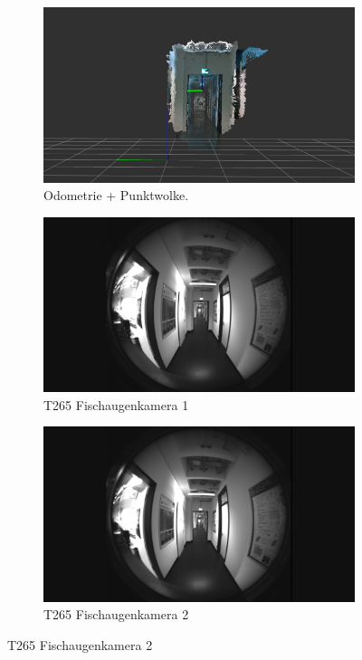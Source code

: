 \begin{figure}[h!]
	\centering
	\begin{subfigure}[b]{0.31\linewidth}
		\includegraphics[width=\linewidth]{images/dataset/pointcloud3.png}
		\caption{Odometrie + Punktwolke.}
	\end{subfigure}
	\begin{subfigure}[b]{0.31\linewidth}
		\includegraphics[width=\linewidth]{images/dataset/f1_frame000005.png}
		\caption{T265 Fischaugenkamera 1 }
	\end{subfigure}
	\begin{subfigure}[b]{0.31\linewidth}
		\includegraphics[width=\linewidth]{images/dataset/f2_frame000005.png}
		\caption{T265 Fischaugenkamera 2}
	\end{subfigure}


\end{figure}
